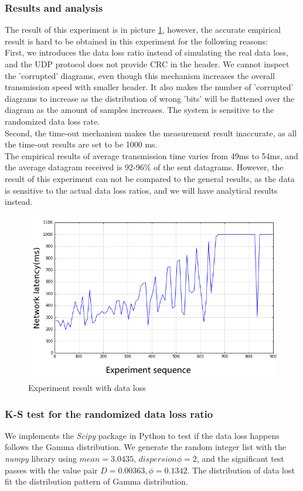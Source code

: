 \documentclass[11pt,openright,a4paper]{report}
\begin{document}
\subsubsection{Results and analysis}
The result of this experiment is in picture \ref{fig:dataLoss}, however, the accurate empirical result is hard to be obtained in this experiment for the following reasons:\\
First, we introduces the data loss ratio instead of simulating the real data loss, and the UDP protocol does not provide CRC in the header. We cannot inspect the 'corrupted' diagrams, even though this mechanism increases the overall transmission speed with smaller header. It also makes the number of 'corrupted' diagrams to increase as the distribution of wrong 'bits' will be flattened over the diagram as the amount of samples increases. The system is sensitive to the randomized data loss rate.\\
Second, the time-out mechanism makes the measurement result inaccurate, as all the time-out results are set to be 1000 ms.\\
The empirical results of average transmission time varies from 49ms to 54ms, and the average datagram received is 92-96\% of the sent datagrams. However, the result of this experiment can not be compared to the general results, as the data is sensitive to the actual data loss ratios, and we will have analytical results instead.\\
\begin{figure}[H]
	\centering
	\includegraphics[width=0.7\linewidth]{picture/experiments/exp1/dataLoss}
	\caption{Experiment result with data loss}
	\label{fig:dataLoss}
\end{figure}
\subsubsection{K-S test for the randomized data loss ratio}
We implements the \textit{Scipy} package in Python to test if the data loss happens follows the Gamma distribution\cite{scipy}. We generate the random integer list with the \textit{numpy} library using $mean=3.0435$, $dispersion \phi =2$, and the significant test passes with the value pair $D=0.00363, \phi = 0.1342$. The distribution of data lost fit the distribution pattern of Gamma distribution.\\
\end{document}
